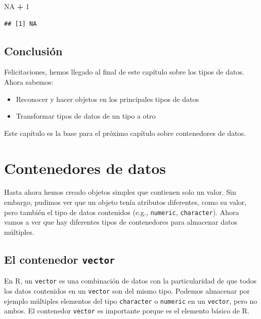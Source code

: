 \documentclass[]{book}
\newenvironment{Shaded}{\begin{snugshade}}{\end{snugshade}}
\newcommand{\DecValTok}[1]{\textcolor[rgb]{0.00,0.00,0.81}{#1}}
\newcommand{\StringTok}[1]{\textcolor[rgb]{0.31,0.60,0.02}{#1}}
\newcommand{\OtherTok}[1]{\textcolor[rgb]{0.56,0.35,0.01}{#1}}
\newcommand{\OperatorTok}[1]{\textcolor[rgb]{0.81,0.36,0.00}{\textbf{#1}}}
\providecommand{\tightlist}{%
  \setlength{\itemsep}{0pt}\setlength{\parskip}{0pt}}
\begin{document}
\begin{Shaded}
\begin{Highlighting}[]
\OtherTok{NA} \OperatorTok{+}\StringTok{ }\DecValTok{1}
\end{Highlighting}
\end{Shaded}

\begin{verbatim}
## [1] NA
\end{verbatim}

\section{Conclusión}\label{conclusion-2}

Felicitaciones, hemos llegado al final de este capítulo sobre los tipos
de datos. Ahora sabemos:

\begin{itemize}
\tightlist
\item
  Reconocer y hacer objetos en los principales tipos de datos
\item
  Transformar tipos de datos de un tipo a otro
\end{itemize}

Este capítulo es la base para el próximo capítulo sobre contenedores de
datos.

\chapter{Contenedores de datos}\label{dataType2}

Hasta ahora hemos creado objetos simples que contienen solo un valor.
Sin embargo, pudimos ver que un objeto tenía atributos diferentes, como
su valor, pero también el tipo de datos contenidos (e.g.,
\texttt{numeric}, \texttt{character}). Ahora vamos a ver que hay
diferentes tipos de contenedores para almacenar datos múltiples.

\section{\texorpdfstring{El contenedor
\texttt{vector}}{El contenedor vector}}\label{el-contenedor-vector}

En R, un \texttt{vector} es una combinación de datos con la
particularidad de que todos los datos contenidos en un \texttt{vector}
son del mismo tipo. Podemos almacenar por ejemplo múltiples elementos
del tipo \texttt{character} o \texttt{numeric} en un \texttt{vector},
pero no ambos. El contenedor \texttt{vector} es importante porque es el
elemento básico de R.
\end{document}
